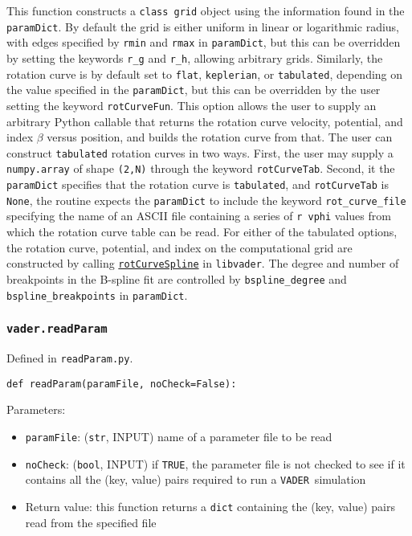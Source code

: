 \documentclass[12pt]{article}
\newcommand{\vader}{\texttt{VADER}}
\begin{document}
This function constructs a \verb=class grid= object using the information found in the \verb=paramDict=. By default the grid is either uniform in linear or logarithmic radius, with edges specified by \verb=rmin= and \verb=rmax= in \verb=paramDict=, but this can be overridden by setting the keywords \verb=r_g= and \verb=r_h=, allowing arbitrary grids. Similarly, the rotation curve is by default set to \verb=flat=, \verb=keplerian=, or \verb=tabulated=, depending on the value specified in the \verb=paramDict=, but this can be overridden by the user setting the keyword \verb=rotCurveFun=. This option allows the user to supply an arbitrary Python callable that returns the rotation curve velocity, potential, and index $\beta$ versus position, and builds the rotation curve from that. The user can construct \verb=tabulated= rotation curves in two ways. First, the user may supply a \verb=numpy.array= of shape \verb=(2,N)= through the keyword \verb=rotCurveTab=. Second, it the \verb=paramDict= specifies that the rotation curve is \verb=tabulated=, and \verb=rotCurveTab= is \verb=None=, the routine expects the \verb=paramDict= to include the keyword \verb=rot_curve_file= specifying the name of an ASCII file containing a series of \verb=r vphi= values from which the rotation curve table can be read. For either of the tabulated options, the rotation curve, potential, and index on the computational grid are constructed by calling \hyperref[sssec:rotCurveSpline]{\texttt{rotCurveSpline}} in \verb=libvader=. The degree and number of breakpoints in the B-spline fit are controlled by \verb=bspline_degree= and \verb=bspline_breakpoints= in \verb=paramDict=.

\subsubsection{\texttt{vader.readParam}}
\label{sssec:vader.readParam}

Defined in \verb=readParam.py=.

\begin{verbatim}
def readParam(paramFile, noCheck=False):
\end{verbatim}

Parameters:
\begin{itemize}
\item \texttt{paramFile}: (\texttt{str}, INPUT) name of a parameter file to be read
\item \texttt{noCheck}: (\texttt{bool}, INPUT) if \texttt{TRUE}, the parameter file is not checked to see if it contains all the (key, value) pairs required to run a \vader\ simulation
\item Return value: this function returns a \texttt{dict} containing the (key, value) pairs read from the specified file
\end{itemize}
\end{document}
